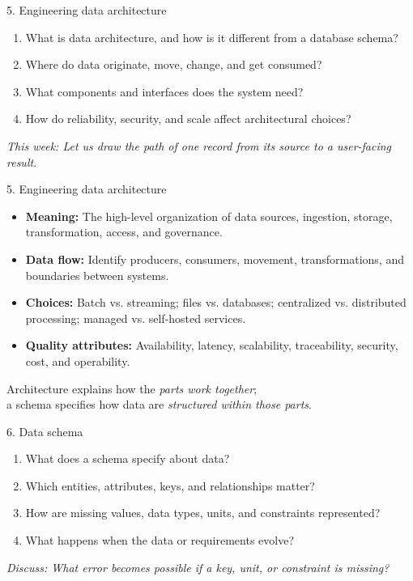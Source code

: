 \documentclass[11pt,aspectratio=43]{beamer}
\begin{document}
\begin{frame}{5. Engineering data architecture}
\begin{enumerate}
  \item What is data architecture, and how is it different from a database schema?
  \item Where do data originate, move, change, and get consumed?
  \item What components and interfaces does the system need?
  \item How do reliability, security, and scale affect architectural choices?
\end{enumerate}
\vspace{1cm}
\small \textit{This week: Let us draw the path of one record from its source to a user-facing result.}
\end{frame}

\begin{frame}{5. Engineering data architecture}
\begin{itemize}
  \item \textbf{Meaning:} The high-level organization of data sources, ingestion, storage, transformation, access, and governance.
  \item \textbf{Data flow:} Identify producers, consumers, movement, transformations, and boundaries between systems.
  \item \textbf{Choices:} Batch vs. streaming; files vs. databases; centralized vs. distributed processing; managed vs. self-hosted services.
  \item \textbf{Quality attributes:} Availability, latency, scalability, traceability, security, cost, and operability.
\end{itemize}
\begin{block}{}
Architecture explains how the \emph{parts work together};\\
a schema specifies how data are \emph{structured within those parts}.
\end{block}
\end{frame}

\begin{frame}{6. Data schema}
\begin{enumerate}
  \item What does a schema specify about data?
  \item Which entities, attributes, keys, and relationships matter?
  \item How are missing values, data types, units, and constraints represented?
  \item What happens when the data or requirements evolve?
\end{enumerate}
\vfill
\small \textit{Discuss: What error becomes possible if a key, unit, or constraint is missing?}
\end{frame}
\end{document}
